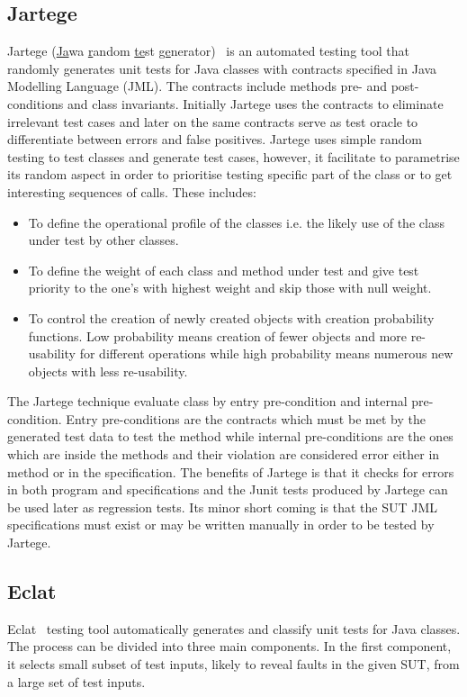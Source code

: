 {\subsection{Jartege}
Jartege (\uline{Ja}wa \uline{r}andom \uline{te}st \uline{ge}nerator)~\cite{Oriat2004} is an automated testing tool that randomly generates unit tests for Java classes with contracts specified in Java Modelling Language (JML). The contracts include methods pre- and post-conditions and class invariants. Initially Jartege uses the contracts to eliminate irrelevant test cases and later on the same contracts serve as test oracle to differentiate between errors and false positives. Jartege uses simple random testing to test classes and generate test cases, however, it facilitate to parametrise its random aspect in order to prioritise testing specific part of the class or to get interesting sequences of calls. These includes: 
\begin{itemize}
\item To define the operational profile of the classes i.e. the likely use of the class under test by other classes.  
\item To define the weight of each class and method under test and give test priority to the one's with highest weight and skip those with null weight.
\item To control the creation of newly created objects with creation probability functions. Low probability means creation of fewer objects and more re-usability for different operations while high probability means numerous new objects with less re-usability.
\end{itemize}

\noindent The Jartege technique evaluate class by entry pre-condition and internal pre-condition. Entry pre-conditions are the contracts which must be met by the generated test data to test the method while internal pre-conditions are the ones which are inside the methods and their violation are considered error either in method or in the specification. The benefits of Jartege is that it checks for errors in both program and specifications and the Junit tests produced by Jartege can be used later as regression tests. Its minor short coming is that the SUT JML specifications must exist or may be written manually in order to be tested by Jartege.

\subsection{Eclat}
Eclat~\cite{Pacheco2005} testing tool automatically generates and classify unit tests for Java classes. The process can be divided into three main components. In the first component, it selects small subset of test inputs, likely to reveal faults in the given SUT, from a large set of test inputs.

}
